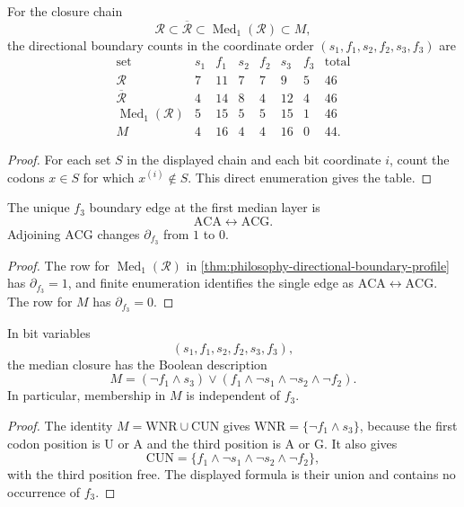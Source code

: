 \begin{theorem}
\label{thm:philosophy-directional-boundary-profile}
For the closure chain
$$
  \mathcal{R}
  \subset
  \overline{\mathcal{R}}
  \subset
  \operatorname{Med}_{1}(\mathcal{R})
  \subset
  M,
$$
the directional boundary counts in the coordinate order
$(s_{1},f_{1},s_{2},f_{2},s_{3},f_{3})$ are
$$
\begin{array}{c|rrrrrr|r}
  \text{set} & s_{1} & f_{1} & s_{2} & f_{2} & s_{3} & f_{3}
  & \text{total}\\
  \hline
  \mathcal{R} & 7 & 11 & 7 & 7 & 9 & 5 & 46\\
  \overline{\mathcal{R}} & 4 & 14 & 8 & 4 & 12 & 4 & 46\\
  \operatorname{Med}_{1}(\mathcal{R}) & 5 & 15 & 5 & 5 & 15 & 1 & 46\\
  M & 4 & 16 & 4 & 4 & 16 & 0 & 44.
\end{array}
$$
\end{theorem}
\begin{proof}
For each set $S$ in the displayed chain and each bit coordinate $i$,
count the codons $x\in S$ for which $x^{(i)}\notin S$. This direct
enumeration gives the table.
\end{proof}

\begin{corollary}
\label{cor:philosophy-final-f3-boundary-seal}
The unique $f_{3}$ boundary edge at the first median layer is
$$
  \mathrm{ACA}\leftrightarrow\mathrm{ACG}.
$$
Adjoining $\mathrm{ACG}$ changes
$\partial_{f_{3}}$ from $1$ to $0$.
\end{corollary}
\begin{proof}
The row for $\operatorname{Med}_{1}(\mathcal{R})$ in
\autoref{thm:philosophy-directional-boundary-profile} has
$\partial_{f_{3}}=1$, and finite enumeration identifies the single
edge as $\mathrm{ACA}\leftrightarrow\mathrm{ACG}$. The row for $M$ has
$\partial_{f_{3}}=0$.
\end{proof}

\begin{theorem}
\label{thm:philosophy-f3-silent-boolean-form}
In bit variables
$$
  (s_{1},f_{1},s_{2},f_{2},s_{3},f_{3}),
$$
the median closure has the Boolean description
$$
  M
  =
  (\neg f_{1}\land s_{3})
  \lor
  (f_{1}\land\neg s_{1}\land\neg s_{2}\land\neg f_{2}).
$$
In particular, membership in $M$ is independent of $f_{3}$.
\end{theorem}
\begin{proof}
The identity $M=\mathrm{WNR}\cup\mathrm{CUN}$ gives
$\mathrm{WNR}=\{\neg f_{1}\land s_{3}\}$, because the first codon
position is $\mathrm{U}$ or $\mathrm{A}$ and the third position is
$\mathrm{A}$ or $\mathrm{G}$. It also gives
$$
  \mathrm{CUN}
  =
  \{f_{1}\land\neg s_{1}\land\neg s_{2}\land\neg f_{2}\},
$$
with the third position free. The displayed formula is their union and
contains no occurrence of $f_{3}$.
\end{proof}

